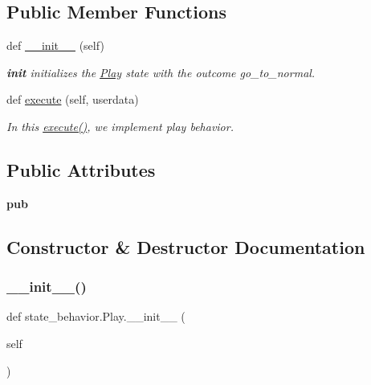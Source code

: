 \subsection*{Public Member Functions}
\begin{DoxyCompactItemize}
\item 
def \hyperlink{classstate__behavior_1_1Play_af233d9d46accf0b314f2216d6add02ae}{\+\_\+\+\_\+init\+\_\+\+\_\+} (self)
\begin{DoxyCompactList}\small\item\em {\bfseries init} initializes the \hyperlink{classstate__behavior_1_1Play}{Play} state with the outcome go\+\_\+to\+\_\+normal. \end{DoxyCompactList}\item 
def \hyperlink{classstate__behavior_1_1Play_a0b3baf44027bc1d5ec262ea8b67063b9}{execute} (self, userdata)
\begin{DoxyCompactList}\small\item\em In this \hyperlink{classstate__behavior_1_1Play_a0b3baf44027bc1d5ec262ea8b67063b9}{execute()}, we implement play behavior. \end{DoxyCompactList}\end{DoxyCompactItemize}
\subsection*{Public Attributes}
\begin{DoxyCompactItemize}
\item 
\mbox{\label{classstate__behavior_1_1Play_a0f0c471a70ad29733e9422a31adea20f}} 
{\bfseries pub}
\end{DoxyCompactItemize}


\subsection{Constructor \& Destructor Documentation}
\mbox{\label{classstate__behavior_1_1Play_af233d9d46accf0b314f2216d6add02ae}} 
\subsubsection{\texorpdfstring{\+\_\+\+\_\+init\+\_\+\+\_\+()}{\_\_init\_\_()}}
{\footnotesize\ttfamily def state\+\_\+behavior.\+Play.\+\_\+\+\_\+init\+\_\+\+\_\+ (\begin{DoxyParamCaption}\item[{}]{self }\end{DoxyParamCaption})}



